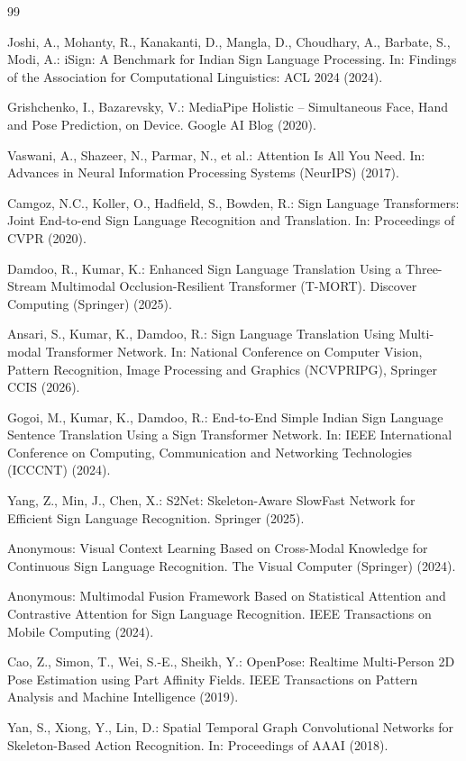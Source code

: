 \documentclass[pdflatex,sn-mathphys-num]{sn-jnl}
\begin{document}

\begin{thebibliography}{99}

 Joshi, A., Mohanty, R., Kanakanti, D., Mangla, D., Choudhary, A., Barbate, S., Modi, A.: iSign: A Benchmark for Indian Sign Language Processing. In: Findings of the Association for Computational Linguistics: ACL 2024 (2024).

 Grishchenko, I., Bazarevsky, V.: MediaPipe Holistic -- Simultaneous Face, Hand and Pose Prediction, on Device. Google AI Blog (2020).

 Vaswani, A., Shazeer, N., Parmar, N., et al.: Attention Is All You Need. In: Advances in Neural Information Processing Systems (NeurIPS) (2017).

 Camgoz, N.C., Koller, O., Hadfield, S., Bowden, R.: Sign Language Transformers: Joint End-to-end Sign Language Recognition and Translation. In: Proceedings of CVPR (2020).

 Damdoo, R., Kumar, K.: Enhanced Sign Language Translation Using a Three-Stream Multimodal Occlusion-Resilient Transformer (T-MORT). Discover Computing (Springer) (2025).

 Ansari, S., Kumar, K., Damdoo, R.: Sign Language Translation Using Multi-modal Transformer Network. In: National Conference on Computer Vision, Pattern Recognition, Image Processing and Graphics (NCVPRIPG), Springer CCIS (2026).

 Gogoi, M., Kumar, K., Damdoo, R.: End-to-End Simple Indian Sign Language Sentence Translation Using a Sign Transformer Network. In: IEEE International Conference on Computing, Communication and Networking Technologies (ICCCNT) (2024).

 Yang, Z., Min, J., Chen, X.: S2Net: Skeleton-Aware SlowFast Network for Efficient Sign Language Recognition. Springer (2025).

 Anonymous: Visual Context Learning Based on Cross-Modal Knowledge for Continuous Sign Language Recognition. The Visual Computer (Springer) (2024).

 Anonymous: Multimodal Fusion Framework Based on Statistical Attention and Contrastive Attention for Sign Language Recognition. IEEE Transactions on Mobile Computing (2024).

 Cao, Z., Simon, T., Wei, S.-E., Sheikh, Y.: OpenPose: Realtime Multi-Person 2D Pose Estimation using Part Affinity Fields. IEEE Transactions on Pattern Analysis and Machine Intelligence (2019).

 Yan, S., Xiong, Y., Lin, D.: Spatial Temporal Graph Convolutional Networks for Skeleton-Based Action Recognition. In: Proceedings of AAAI (2018).

\end{thebibliography}
\end{document}
